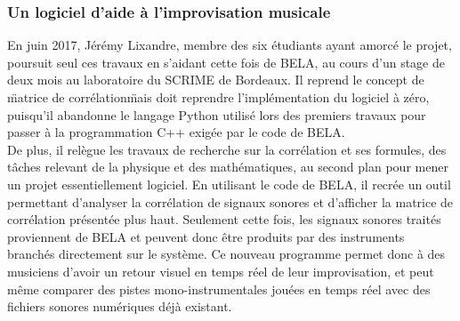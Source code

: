 \subsubsection{Un logiciel d'aide à l'improvisation musicale}
En juin 2017, Jérémy Lixandre, membre des six étudiants ayant amorcé
le projet, poursuit seul ces travaux en s'aidant cette fois de BELA,
au cours d'un stage de deux mois au laboratoire du SCRIME de
Bordeaux. Il reprend le concept de \"matrice de corrélation\" mais
doit reprendre l'implémentation du logiciel à zéro, puisqu'il
abandonne le langage Python utilisé lors des premiers travaux pour
passer à la programmation C++ exigée par le code de BELA. \\
De plus, il relègue les travaux de recherche sur la corrélation et ses
formules, des tâches relevant de la physique et des mathématiques, au
second plan pour mener un projet essentiellement logiciel. En
utilisant le code de BELA, il recrée un outil permettant d'analyser la
corrélation de signaux sonores et d'afficher la matrice de corrélation
présentée plus haut. Seulement cette fois, les signaux sonores traités
proviennent de BELA et peuvent donc être produits par des instruments
branchés directement sur le système. Ce nouveau programme permet donc
à des musiciens d'avoir un retour visuel en temps réel de leur
improvisation, et peut même comparer des pistes mono-instrumentales
jouées en temps réel avec des fichiers sonores numériques déjà
existant.

